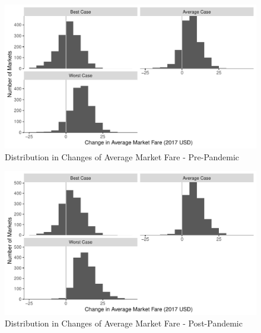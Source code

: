 \documentclass{article}
\begin{document}
\begin{appendices}
    \begin{figure}
        \caption{Distribution in Changes of Average Market Fare - Pre-Pandemic}
        \label{fig:AverageFare_ChangeDist_PrePandemic}
        \begin{center}
        \includegraphics[width = \linewidth]{PrePandemic_Merger_Change_AverageFare_Dist.pdf}
        \end{center}
    \end{figure}

    \begin{figure}
        \caption{Distribution in Changes of Average Market Fare - Post-Pandemic}
        \label{fig:AverageFare_ChangeDist_PostPandemic}
        \begin{center}
        \includegraphics[width = \linewidth]{Merger_Change_AverageFare_Dist.pdf}
        \end{center}
    \end{figure}


\end{appendices}
\end{document}
